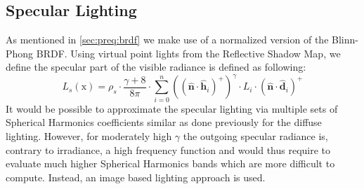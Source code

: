 \documentclass[thesis.tex]{subfiles}
\begin{document}
\subsection{Specular Lighting} \label{sec:impl:specenvmap}
As mentioned in \autoref{sec:preq:brdf} we make use of a normalized version of the Blinn-Phong BRDF.
Using virtual point lights from the Reflective Shadow Map, we define the specular part of the visible radiance is defined as following:
\begin{equation}
L_s (\mathrm{x}) = \rho_s \cdot \frac{\gamma + 8}{8\pi} \cdot \sum\limits_{i=0}^{n} ((\hat{\mathbf{n}} \cdot \hat{\mathbf{h}}_i)^+)^\gamma \cdot L_i \cdot (\hat{\mathbf{n}} \cdot \hat{\mathbf{d}}_i)^+
\end{equation}
It would be possible to approximate the specular lighting via multiple sets of Spherical Harmonics coefficients similar as done previously for the diffuse lighting.
However, for moderately high $\gamma$ the outgoing specular radiance is, contrary to irradiance, a high frequency function and would thus require to evaluate much higher Spherical Harmonics bands which are more difficult to compute. Instead, an image based lighting approach is used.
\end{document}

